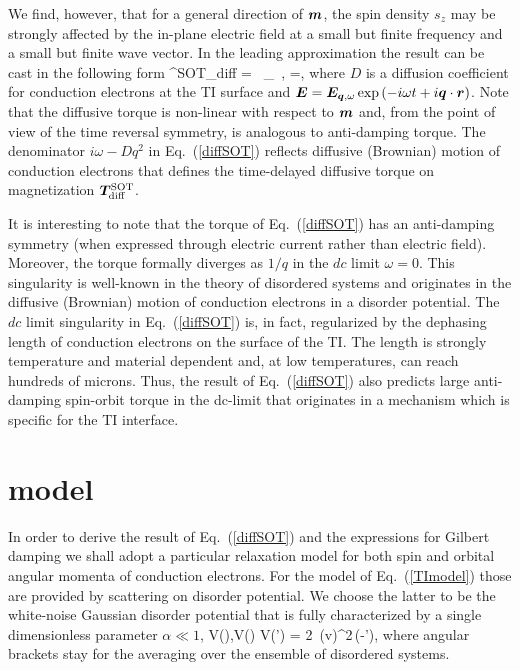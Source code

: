 We find, however, that for a general direction of $\boldsymbol{m}$, the spin density $s_z$ may be strongly affected by the in-plane electric field at a small but finite frequency and a small but finite wave vector. In the leading approximation the result can be cast in the following form 
\be
\label{diffSOT}
^\textrm{SOT}_\textrm{diff} = \eta\, \times{}_\perp\, ,\quad
\eta=,
\e
where $D$ is a diffusion coefficient for conduction electrons at the TI surface and $\boldsymbol{E}= \boldsymbol{E}_{\boldsymbol{q},\omega}\exp\left(-i\omega t+i\boldsymbol{q}\cdot\boldsymbol{r}\right)$. Note that the diffusive torque is non-linear with respect to $\boldsymbol{m}$ and, from the point of view of the time reversal symmetry, is analogous to anti-damping torque. The denominator $i\omega -Dq^2$ in Eq.~(\ref{diffSOT}) reflects diffusive (Brownian) motion of conduction electrons that defines the time-delayed diffusive torque on magnetization $\boldsymbol{T}^\textrm{SOT}_\textrm{diff}$.  

It is interesting to note that the torque of Eq.~(\ref{diffSOT}) has an anti-damping symmetry (when expressed through electric current rather than electric field). Moreover, the torque formally diverges as $1/q$ in the $dc$ limit $\omega=0$. This singularity is well-known in the theory of disordered systems \cite{maleev1975corrections,maleev1976corrections,altshuler1985electron} and originates in the diffusive (Brownian) motion of conduction electrons in a disorder potential.  The $dc$ limit singularity in Eq.~(\ref{diffSOT}) is, in fact, regularized by the dephasing length of conduction electrons on the surface of the TI. The length is strongly temperature and material dependent and, at low temperatures, can reach hundreds of microns. Thus, the result of Eq.~(\ref{diffSOT}) also predicts large anti-damping spin-orbit torque in the dc-limit that originates in a mechanism which is specific for the TI interface. 

\section{model}
In order to derive the result of Eq.~(\ref{diffSOT}) and the expressions for Gilbert damping we shall adopt a particular relaxation model for both spin and orbital angular momenta of conduction electrons. For the model of Eq.~(\ref{TImodel}) those are provided by scattering on disorder potential. We choose the latter 
to be the white-noise Gaussian disorder potential that is fully characterized by a single dimensionless parameter $\alpha\ll 1$,
\be
\label{disorder}
\la V(),\quad \la V() V(') \ra = 2\pi \alpha\, (\hslash v)^2\,\delta(-'),
\e
where angular brackets stay for the averaging over the ensemble of disordered systems. 

